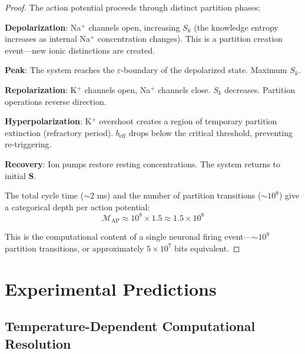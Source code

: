 \documentclass[twocolumn,10pt]{article}
\theoremstyle{remark}
\newcommand{\Depth}{\mathcal{M}}
\newcommand{\Sk}{S_k}
\newcommand{\eps}{\varepsilon}
\newcommand{\Scoord}{\mathbf{S}}
\begin{document}
\begin{proof}
The action potential proceeds through distinct partition phases:

\textbf{Depolarization}: Na$^+$ channels open, increasing $\Sk$ (the knowledge entropy increases as internal Na$^+$ concentration changes). This is a partition creation event---new ionic distinctions are created.

\textbf{Peak}: The system reaches the $\eps$-boundary of the depolarized state. Maximum $\Sk$.

\textbf{Repolarization}: K$^+$ channels open, Na$^+$ channels close. $\Sk$ decreases. Partition operations reverse direction.

\textbf{Hyperpolarization}: K$^+$ overshoot creates a region of temporary partition extinction (refractory period). $b_{\text{eff}}$ drops below the critical threshold, preventing re-triggering.

\textbf{Recovery}: Ion pumps restore resting concentrations. The system returns to initial $\Scoord$.

The total cycle time ($\sim 2$ ms) and the number of partition transitions ($\sim 10^8$) give a categorical depth per action potential:
\begin{equation}
    \Depth_{\text{AP}} \approx 10^8 \times 1.5 \approx 1.5 \times 10^8
\end{equation}

This is the computational content of a single neuronal firing event---$\sim 10^8$ partition transitions, or approximately $5 \times 10^7$ bits equivalent.
\end{proof}

\section{Experimental Predictions}
\label{sec:predictions}

\subsection{Temperature-Dependent Computational Resolution}
\end{document}
